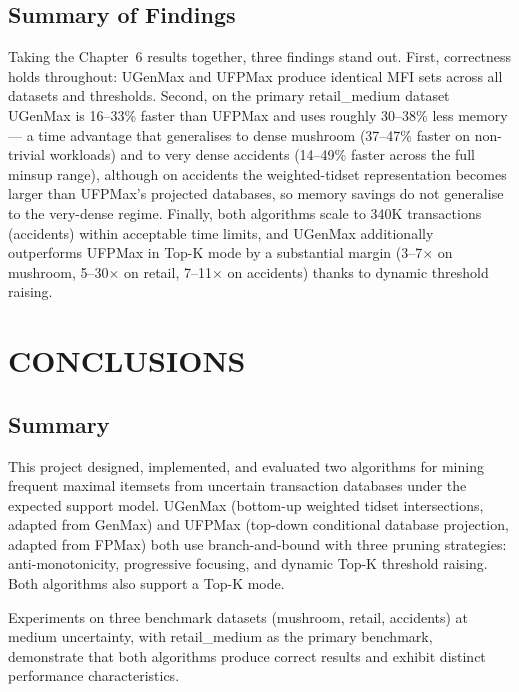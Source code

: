 \documentclass[12pt,a4paper]{report}
\begin{document}
  \section{Summary of Findings}

  Taking the Chapter~6 results together, three findings stand out. First, correctness holds throughout: UGenMax and UFPMax produce identical MFI sets across all datasets and thresholds. Second, on the primary retail\_medium dataset UGenMax is 16--33\% faster than UFPMax and uses roughly 30--38\% less memory --- a time advantage that generalises to dense mushroom (37--47\% faster on non-trivial workloads) and to very dense accidents (14--49\% faster across the full minsup range), although on accidents the weighted-tidset representation becomes larger than UFPMax's projected databases, so memory savings do not generalise to the very-dense regime. Finally, both algorithms scale to 340K transactions (accidents) within acceptable time limits, and UGenMax additionally outperforms UFPMax in Top-K mode by a substantial margin (3--7$\times$ on mushroom, 5--30$\times$ on retail, 7--11$\times$ on accidents) thanks to dynamic threshold raising.

  \chapter{CONCLUSIONS}

  \section{Summary}

  This project designed, implemented, and evaluated two algorithms for mining frequent maximal itemsets from uncertain transaction databases under the expected support model. UGenMax (bottom-up weighted tidset intersections, adapted from GenMax) and UFPMax (top-down conditional database projection, adapted from FPMax) both use branch-and-bound with three pruning strategies: anti-monotonicity, progressive focusing, and dynamic Top-K threshold raising. Both algorithms also support a Top-K mode.

  Experiments on three benchmark datasets (mushroom, retail, accidents) at medium uncertainty, with retail\_medium as the primary benchmark, demonstrate that both algorithms produce correct results and exhibit distinct performance characteristics.
\end{document}
